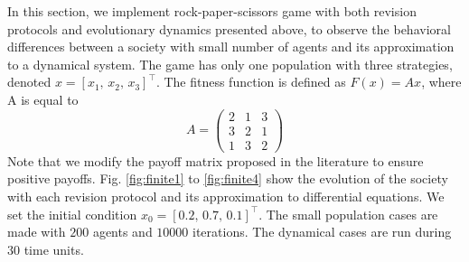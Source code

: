 In this section, we implement rock-paper-scissors game with both revision protocols and evolutionary dynamics presented above, to observe the behavioral differences between a society with small number of agents and its approximation to a dynamical system.
The game has only one population with three strategies, denoted $x = [x_1, \, x_2, \, x_3]^\top$. The fitness function is defined as $F(x)=Ax$, where A is equal to 
\begin{equation}
  A = \begin{pmatrix}
  2  & 1 &  3 \\
  3  & 2 &  1 \\
  1 &  3 &  2
  \end{pmatrix}
\end{equation}
Note that we modify the payoff matrix proposed in the literature to ensure positive payoffs.
Fig. \ref{fig:finite1} to \ref{fig:finite4} show the evolution of the society with each revision protocol and its approximation to differential equations. We set the initial condition $x_0 = [0.2, \, 0.7, \, 0.1 ]^\top$. The small population cases are made with $200$ agents and $10000$ iterations. The dynamical cases are run during 
30 time units.






